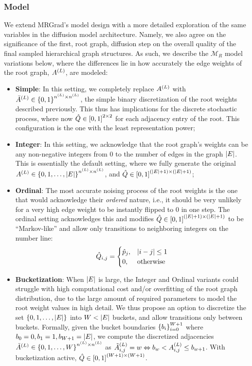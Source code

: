 \subsubsection{Model}
We extend MRGrad's model design with a more detailed exploration of the same variables in the diffusion model architecture. Namely, we also agree on the significance of the first, root graph, diffusion step on the overall quality of the final sampled hierarchical graph structures. As such, we describe the $\mathcal{M}_R$ model variations below, where the differences lie in how accurately the edge weights of the root graph, $A^{\mathopen{}\left(L\right)}$, are modeled:
\begin{itemize}
    \item \textbf{Simple}: In this setting, we completely replace $A^{\mathopen{}\left(L\right)}$ with $\bar{A}^{\mathopen{}\left(L\right)} \in \mathopen{}\left\{0,1\right\}^{n^{\mathopen{}\left(L\right)} \times n^{\mathopen{}\left(L\right)}}$, the simple binary discretization of the root weights described previously. This thus has implications for the discrete stochastic process, where now $\hat{Q}\in\mathopen{}\left[0,1\right]^{2 \times 2}$ for each adjacency entry of the root. This configuration is the one with the least representation power;
    \item \textbf{Integer}: In this setting, we acknowledge that the root graph's weights can be any non-negative integers from 0 to the number of edges in the graph $\mathopen{}\left|E\right|$. This is essentially the default setting, where we fully generate the original $A^{\mathopen{}\left(L\right)} \in \mathopen{}\left\{0,1,\dots,\mathopen{}\left|E\right|\right\}^{n^{\mathopen{}\left(L\right)} \times n^{\mathopen{}\left(L\right)}}$, and $\hat{Q}\in\mathopen{}\left[0,1\right]^{\mathopen{}\left(\mathopen{}\left|E\right|+1\right) \times \mathopen{}\left(\mathopen{}\left|E\right|+1\right)}$;
    \item \textbf{Ordinal}: The most accurate noising process of the root weights is the one that would acknowledge their \emph{ordered} nature, i.e., it should be very unlikely for a very high edge weight to be instantly flipped to 0 in one step. The ordinal setting acknowledges this and modifies $\hat{Q} \in \mathopen{}\left[0,1\right]^{\mathopen{}\left(\mathopen{}\left|E\right|+1\right) \times \mathopen{}\left(\mathopen{}\left|E\right|+1\right)}$ to be \enquote{Markov-like} and allow only transitions to neighboring integers on the number line: 
    \begin{equation}
        \hat{Q}_{i,j}=\begin{cases}
            \hat{p}_j, & \mathopen{}\left|i-j\right|\leq 1 \\
            0, & \text{otherwise}
        \end{cases}
    \end{equation}
    \item \textbf{Bucketization}: When $\mathopen{}\left|E\right|$ is large, the Integer and Ordinal variants could struggle with high computational cost and/or overfitting of the root graph distribution, due to the large amount of required parameters to model the root weight values in high detail. We thus propose an option to discretize the set $\mathopen{}\left\{0,1,\dots,\mathopen{}\left|E\right|\right\}$ into $W<\mathopen{}\left|E\right|$ buckets, and allow transitions only between buckets. Formally, given the bucket boundaries $\mathopen{}\left\{b_i\right\}_{i=0}^{W+1}$ where $b_0=0,b_1=1,b_{W+1}=\mathopen{}\left|E\right|$, we compute the discretized adjacencies $\tilde{A}^{\mathopen{}\left(L\right)} \in \mathopen{}\left\{0,1,\dots,W\right\}^{n^{\mathopen{}\left(L\right)} \times n^{\mathopen{}\left(L\right)}}$ as $\tilde{A}_{i,j}^{\mathopen{}\left(L\right)}=w \Leftrightarrow b_w < A_{i,j}^{\mathopen{}\left(L\right)} \leq  b_{w+1}$. With bucketization active, $\hat{Q} \in \mathopen{}\left[0,1\right]^{\mathopen{}\left(W+1\right) \times \mathopen{}\left(W+1\right)}$.

\end{itemize}
